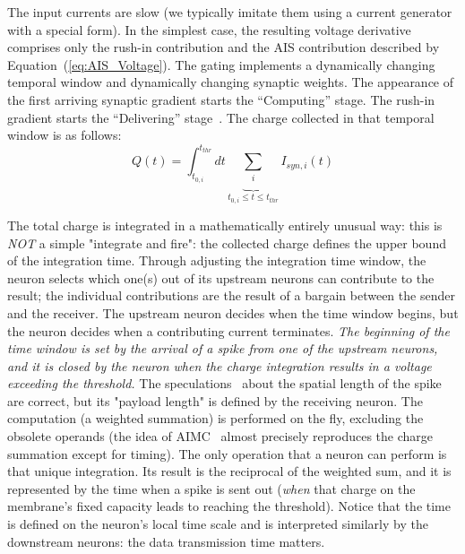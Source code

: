 The input currents are slow (we typically imitate them using a current generator with a special form).
In the simplest case, the resulting voltage derivative comprises only
the rush-in contribution %
and the \gls{AIS} contribution described by Equation~(\ref{eq:AIS_Voltage}).
The gating implements a dynamically changing temporal window and dynamically
changing synaptic weights. The appearance of the first arriving synaptic
gradient starts the ``Computing'' stage. The rush-in gradient starts
the ``Delivering'' stage~\cite{VeghNeuronAlgorithms:2025}. The charge collected in that temporal window is as follows: 
\begin{equation}
	Q(t)=\int_{t_{0,i}}^{{t_{thr}}}dt\underbrace{\sum_{i}}_{{t_{0,i}\le t\le t_{thr}}}I_{syn,i}(t)
\end{equation}

The total charge is integrated in a mathematically entirely unusual
way: this is \textit{NOT} a simple "integrate and fire": the collected charge defines the upper bound of the integration time. Through adjusting the integration time window, the neuron selects which
one(s) out of its upstream neurons can contribute to the result; the
individual contributions are the result of a bargain between the sender and the
receiver. The upstream neuron decides when the time window begins, but the neuron decides when a contributing current terminates. \emph{The beginning
	of the time window is set by the arrival of a spike from one of the
	upstream neurons, and it is closed by the neuron when the charge integration
	results in a voltage exceeding the threshold.}
The speculations~\cite{MechanicalPropertiesNerves:2025} about the spatial length of the spike are correct, but its "payload length" is defined by the receiving neuron. The computation (a
weighted summation) is performed on the fly, excluding the obsolete
operands (the
idea of \gls{AIMC}~\cite{AnalogInMemoryComputing:2024}
almost precisely reproduces the charge summation except for timing). The
only operation that a neuron can perform is that unique integration.
Its result is the reciprocal of the weighted sum, and it is represented
by the time when a spike is sent out (\emph{when} that charge on the
membrane's fixed capacity leads to reaching the threshold). Notice
that the time is defined on the neuron's local time scale and is interpreted
similarly by the downstream neurons: the data transmission time matters.

